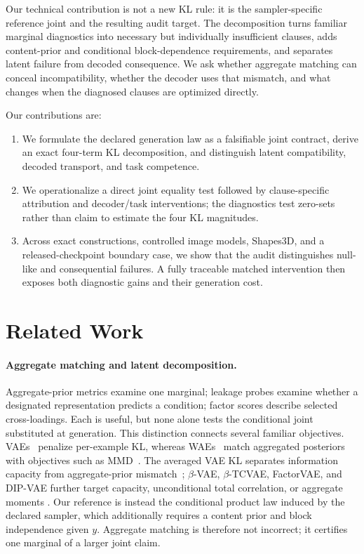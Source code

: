 \documentclass{article}
\begin{document}
Our technical contribution is not a new KL rule: it is the sampler-specific
reference joint and the resulting audit target.  The decomposition turns
familiar marginal diagnostics into necessary but individually insufficient
clauses, adds content-prior and conditional block-dependence requirements, and
separates latent failure from decoded consequence.  We ask whether aggregate
matching can conceal incompatibility, whether the decoder uses that mismatch,
and what changes when the diagnosed clauses are optimized directly.

Our contributions are:
\begin{enumerate}
    \item We formulate the declared generation law as a falsifiable joint
    contract, derive an exact four-term KL decomposition, and distinguish latent
    compatibility, decoded transport, and task competence.
    \item We operationalize a direct joint equality test followed by clause-specific
    attribution and decoder/task interventions; the diagnostics test zero-sets
    rather than claim to estimate the four KL magnitudes.
    \item Across exact constructions, controlled image models, Shapes3D, and a
    released-checkpoint boundary case, we show that the audit distinguishes
    null-like and consequential failures.  A fully traceable matched intervention
    then exposes both diagnostic gains and their generation cost.
\end{enumerate}

\section{Related Work}
\label{sec:related}

\paragraph{Aggregate matching and latent decomposition.}
Aggregate-prior metrics examine one marginal; leakage probes examine whether
a designated representation predicts a condition; factor scores describe
selected cross-loadings.  Each is useful, but none alone tests the conditional
joint substituted at generation.  This distinction connects several familiar
objectives.  VAEs~\citep{kingma2013autoencoding} penalize per-example KL,
whereas WAEs~\citep{tolstikhin2017wasserstein} match aggregated posteriors with
objectives such as MMD~\citep{gretton2012kernel}.  The averaged VAE KL separates
information capacity from aggregate-prior mismatch~\citep{hoffman2016elbo};
$\beta$-VAE, $\beta$-TCVAE, FactorVAE, and DIP-VAE further target capacity,
unconditional total correlation, or aggregate moments
\citep{higgins2017beta,chen2018isolating,kim2018disentangling,kumar2018dipvae}.
Our reference is instead the conditional product law induced by the declared
sampler, which additionally requires a content prior and block independence
given $y$.  Aggregate matching is therefore not incorrect; it certifies one
marginal of a larger joint claim.
\end{document}
